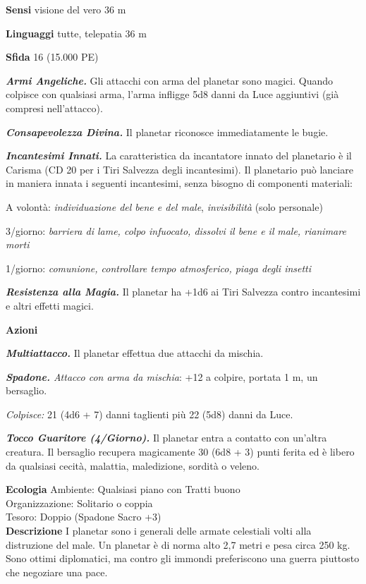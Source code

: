\begin{multicols}{2}
\textbf{Sensi} visione del vero 36 m

\textbf{Linguaggi} tutte, telepatia 36 m

\textbf{Sfida} 16 (15.000 PE)

\emph{\textbf{Armi Angeliche.}} Gli attacchi con arma del planetar sono magici. Quando colpisce con qualsiasi arma, l'arma infligge 5d8 danni da Luce aggiuntivi (già compresi nell'attacco).

\emph{\textbf{Consapevolezza Divina.}} Il planetar riconosce immediatamente le bugie.

\emph{\textbf{Incantesimi Innati.}} La caratteristica da incantatore innato del planetario è il Carisma (CD 20 per i Tiri Salvezza degli incantesimi). Il planetario può lanciare in maniera innata i seguenti incantesimi, senza bisogno di componenti materiali:

A volontà: \emph{individuazione del bene e del male}, \emph{invisibilità} (solo personale)

3/giorno: \emph{barriera di lame, colpo infuocato, dissolvi il bene e il} \emph{male, rianimare morti}

1/giorno: \emph{comunione, controllare tempo atmosferico, piaga degli insetti}

\emph{\textbf{Resistenza alla Magia.}} Il planetar ha +1d6 ai Tiri Salvezza contro incantesimi e altri effetti magici.

\textbf{Azioni}

\emph{\textbf{Multiattacco.}} Il planetar effettua due attacchi da mischia.

\emph{\textbf{Spadone.} Attacco con arma da mischia}: +12 a colpire, portata 1 m, un bersaglio.

\emph{Colpisce:} 21 (4d6 + 7) danni taglienti più 22 (5d8) danni da Luce.

\emph{\textbf{Tocco Guaritore (4/Giorno).}} Il planetar entra a contatto con un'altra creatura. Il bersaglio recupera magicamente 30 (6d8 + 3) punti ferita ed è libero da qualsiasi cecità, malattia, maledizione, sordità o veleno.

\textbf{Ecologia}
Ambiente: Qualsiasi piano con Tratti buono\\
Organizzazione: Solitario o coppia\\
Tesoro: Doppio (Spadone Sacro +3)\\
\textbf{Descrizione}
I planetar sono i generali delle armate celestiali volti alla distruzione del male. Un planetar è di norma alto 2,7 metri e pesa circa 250 kg. Sono ottimi diplomatici, ma contro gli immondi preferiscono una guerra piuttosto che negoziare una pace.\\



\end{multicols}

